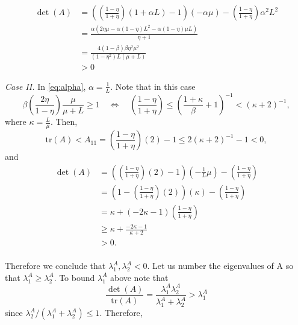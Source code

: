 \documentclass[11pt]{article}
\begin{document}
\begin{align*}
	 \det(A) &=\left({\left(\frac{1-\eta}{1+\eta}\right)}(1+\alpha  L)-1\right)( -\alpha\mu ) -  {\left(\frac{1-\eta}{1+\eta}\right)}\alpha^2 L^2\\
	 &=\frac{\alpha  \left(2 \eta  \mu -\alpha  (1-\eta ) L^2-\alpha  (1-\eta ) \mu  L\right)}{\eta +1} \\
	         &= \frac{4 (1-\beta ) \beta  \eta ^2 \mu ^2}{\left(1-\eta ^2\right) L (\mu +L)}\\
	         &> 0
\end{align*}

\noindent
\textit{Case II.} In \eqref{eq:alpha}, $\alpha = \frac{1}{L}$.  Note that in this case
\begin{equation}\label{eq:step}
  \beta\left(\frac{2 \eta}{1-\eta} \right)\frac{\mu}{\mu+L} \geq  1 \quad \Leftrightarrow \quad {\left(\frac{1-\eta}{1+\eta}\right)} \leq \left(\frac{1+\kappa}{\beta} + 1\right)^{-1} < \left(\kappa + 2 \right)^{-1},
\end{equation}
where $\kappa = \displaystyle\frac{L}{\mu}$.
Then,
\[
 \mbox{tr}(A) < A_{11} = {\left(\frac{1-\eta}{1+\eta}\right)}(2)-1 \leq 2\left(\kappa + 2 \right)^{-1} - 1<0,
\]
and
\begin{align*}
 \det(A) &= \left({\left(\frac{1-\eta}{1+\eta}\right)}(2)-1\right)( -\frac{1}{L}\mu ) -  {\left(\frac{1-\eta}{1+\eta}\right)}\\
         &= \left(1-{\left(\frac{1-\eta}{1+\eta}\right)}(2)\right)( \kappa) -  {\left(\frac{1-\eta}{1+\eta}\right)}\\
         &= \kappa + (-2\kappa -  1){\left(\frac{1-\eta}{1+\eta}\right)}\\
         &\geq  \kappa + \frac{-2\kappa -  1}{\kappa + 2}\\
         &> 0.\\
\end{align*}



Therefore we conclude that $\lambda^A_1,\lambda^A_2<0$.  Let us number the eigenvalues of A so that $\lambda^A_1 \geq \lambda^A_2$.
To bound  $\lambda^A_1$ above note that
\[
	\frac{\det(A)}{\mbox{tr}(A)} =\frac{ \lambda^A_1 \lambda^A_2} {\lambda^A_1 + \lambda^A_2} > \lambda^A_1
\]	
since $ \lambda^A_2 /  ( \lambda^A_1 + \lambda^A_2 )\leq 1$.
%
Therefore,
\end{document}
